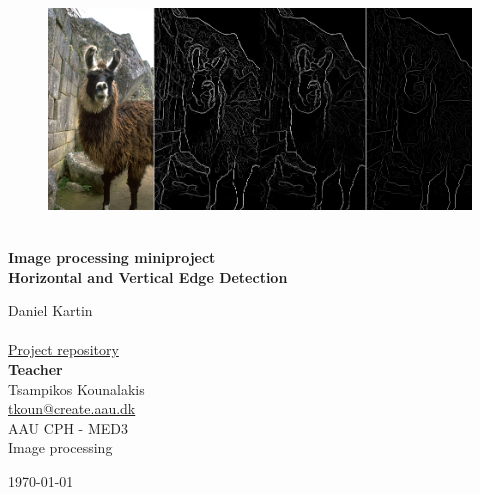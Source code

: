 \begin{titlepage}
			
\addtolength{\voffset}{2cm}

\begin{figure}[H]
\centering
\vspace{2cm}	%
\includegraphics[width=0.99\linewidth]{figure/Frontpage/frontpage.png}
\end{figure}

\mbox{}
\vfill
\renewcommand{\familydefault}{\sfdefault} \normalfont %
\HRule\\[0.2cm]
\textbf{{\small Image processing miniproject\\ \Huge  Horizontal and Vertical Edge Detection}}\\
\HRule\medskip{}
\begin{multicols}{2}
{\Large Daniel Kartin\\\\\href{https://github.com/totalfreak/opencvFilters}{\color{blue}Project repository}\columnbreak}\\
\setlength{\parskip}{2.4cm}
\Large{\textbf{Teacher}\\Tsampikos Kounalakis\\\href{mailto:tkoun@create.aau.dk }{tkoun@create.aau.dk}}
\\\small AAU CPH - 
MED3 \\
Image processing\\
\end{multicols}
\today
\renewcommand{\familydefault}{\rmdefault} \normalfont %
\end{titlepage}


